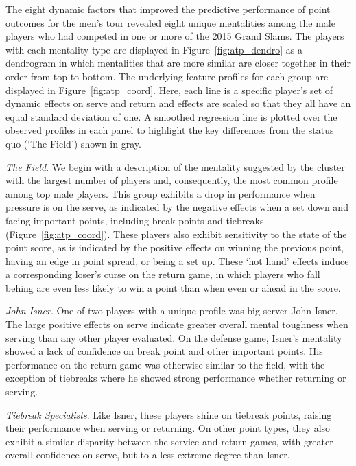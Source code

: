 \documentclass{Latex/svjour3}
\begin{document}
The eight dynamic factors that improved the predictive performance of point
outcomes for the men's tour revealed eight unique mentalities among the male
players who had competed in one or more of the 2015 Grand Slams. The players
with each mentality type are displayed in Figure~\ref{fig:atp_dendro} as a
dendrogram in which mentalities that are more similar are closer together in
their order from top to bottom. The underlying feature profiles for each group
are displayed in Figure~\ref{fig:atp_coord}. Here, each line is a specific
player's set of dynamic effects on serve and return and effects are scaled so
that they all have an equal standard deviation of one. A smoothed regression
line is plotted over the observed profiles in each panel to highlight the key
differences from the status quo (`The Field') shown in gray.

\textit{The Field}. We begin with a description of the mentality suggested by
the cluster with the largest number of players and, consequently, the most
common profile among top male players. This group exhibits a drop in performance
when pressure is on the serve, as indicated by the negative effects when a set
down and facing important points, including break points and tiebreaks
(Figure~\ref{fig:atp_coord}). These players also exhibit sensitivity to the
state of the point score, as is indicated by the positive effects on winning the
previous point, having an edge in point spread, or being a set up. These `hot
hand' effects induce a corresponding loser's curse on the return game, in which
players who fall behing are even less likely to win a point than when even or
ahead in the score.

\textit{John Isner}. One of two players with a unique profile was big server
John Isner. The large positive effects on serve indicate greater overall mental
toughness when serving than any other player evaluated. On the defense game,
Isner's mentality showed  a lack of confidence on break point and other
important points. His performance on the return game was otherwise similar to
the field, with the exception of tiebreaks where he showed strong performance
whether returning or serving.

\textit{Tiebreak Specialists}. Like Isner, these players shine on tiebreak
points, raising their performance when serving or returning. On other point
types, they also exhibit a similar disparity between the service and return
games, with greater overall confidence on serve, but to a less extreme degree
than Isner.
\end{document}
